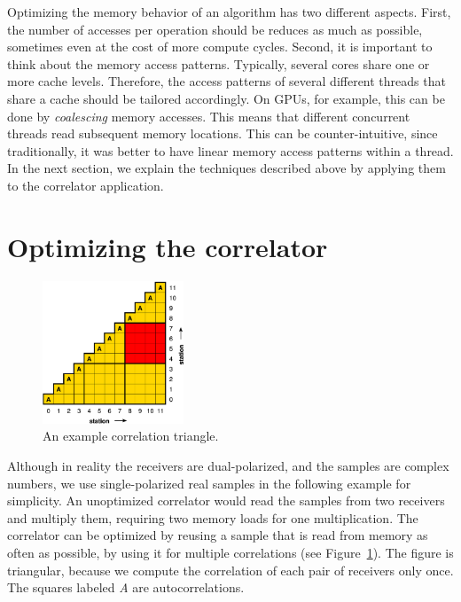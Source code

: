 \documentclass{article}
\begin{document}
Optimizing the memory behavior of an algorithm has two different
aspects.  First, the number of accesses per operation should be
reduces as much as possible, sometimes even at the cost of more
compute cycles.  Second, it is important to think about the memory
access patterns. Typically, several cores share one or more cache
levels. Therefore, the access patterns of several different threads
that share a cache should be tailored accordingly. On GPUs, for
example, this can be done by \emph{coalescing} memory accesses.  This
means that different concurrent threads read subsequent memory
locations.  This can be counter-intuitive, since traditionally, it was
better to have linear memory access patterns within a thread.  In the
next section, we explain the techniques described above by applying
them to the correlator application.


\section{Optimizing the correlator}
\label{sec:optimizing}


\begin{figure}[t]
\begin{center}
\includegraphics[width=4.2cm]{figures/correlation-triangle.pdf}
\end{center}
\vspace{-0.5cm}
\caption{An example correlation triangle.}
\label{fig-correlation}
\end{figure}

Although in reality the receivers are dual-polarized, and the samples are complex numbers, 
we use single-polarized real samples in the following example for simplicity.
An unoptimized correlator would read the samples from two receivers and
multiply them, requiring two memory loads for one multiplication.
The correlator can be optimized by reusing a sample that is read from memory
as often as possible, by using it for multiple correlations (see
Figure~\ref{fig-correlation}).
The figure is triangular, because we compute
the correlation of each pair of receivers only once. The squares labeled \emph{A} are
autocorrelations.
\end{document}
